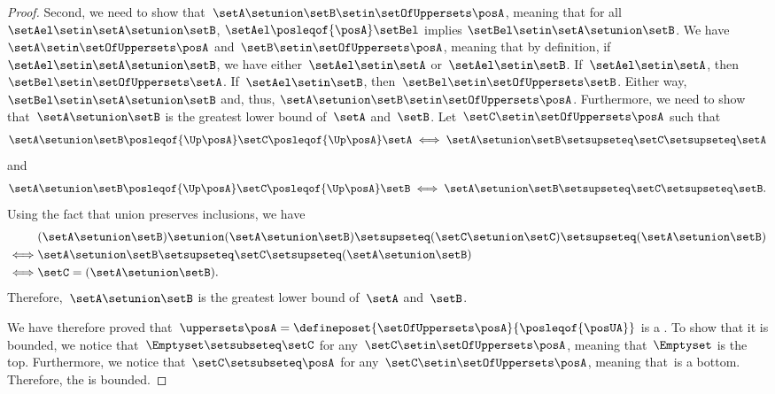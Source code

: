 \begin{proof}
    Second, we need to show that~$\setA\setunion \setB\setin \setOfUppersets \posA$, meaning that for all $\setAel \setin \setA\setunion\setB$, $\setAel \posleqof{\posA} \setBel$ implies $\setBel \setin \setA\setunion\setB$.
    We have~$\setA \setin \setOfUppersets \posA$ and~$\setB \setin \setOfUppersets \posA$, meaning that by definition, if~$\setAel\setin \setA\setunion \setB$, we have either~$\setAel\setin \setA$ or~$\setAel\setin \setB$.
    If~$\setAel\setin \setA$, then~$\setBel\setin \setOfUppersets \setA$.
    If~$\setAel\setin \setB$, then~$\setBel \setin \setOfUppersets \setB$.
    Either way, $\setBel \setin \setA\setunion\setB$ and, thus, $\setA \setunion \setB \setin \setOfUppersets\posA$.
    Furthermore, we need to show that~$\setA\setunion \setB$ is the greatest lower bound of~$\setA$ and~$\setB$.
    Let~$\setC\setin \setOfUppersets \posA$ such that
    \[
        \setA\setunion \setB\posleqof{\Up \posA} \setC \posleqof{\Up \posA} \setA
        \iff
        \setA\setunion \setB\setsupseteq \setC\setsupseteq \setA
    \]
    and
    \[
        \setA\setunion \setB\posleqof{\Up \posA} \setC \posleqof{\Up \posA} \setB
        \iff
        \setA\setunion \setB\setsupseteq \setC\setsupseteq \setB.
    \]
    Using the fact that union preserves inclusions, we have
    \begin{equation*}
        \begin{aligned}
                 & (\setA\setunion \setB)
            \setunion (\setA\setunion \setB)  \setsupseteq (\setC \setunion \setC) \setsupseteq (\setA\setunion \setB) \\
            \iff & \setA\setunion \setB              \setsupseteq \setC\setsupseteq (\setA\setunion \setB ) \\
            \iff & \setC                             =(\setA\setunion \setB).
        \end{aligned}
    \end{equation*}
    Therefore,~$\setA\setunion \setB$ is the greatest lower bound of~$\setA$ and~$\setB$.

    We have therefore proved that~$\uppersets \posA=\defineposet{\setOfUppersets \posA}{\posleqof{\posUA}}$ is a .
    To show that it is bounded, we notice that~$\Emptyset \setsubseteq \setC$ for any~$\setC\setin \setOfUppersets \posA$, meaning that~$\Emptyset$ is the top.
    Furthermore, we notice that~$\setC\setsubseteq \posA$ for any~$\setC\setin \setOfUppersets \posA$, meaning that~\posA is a bottom.
    Therefore, the  is bounded.
\end{proof}

